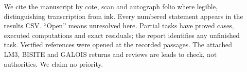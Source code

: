 We cite the manuscript \citep{D_Grothendieck1981} by cote, scan and autograph
folio where legible, distinguishing transcription from ink. Every numbered
statement appears in the results CSV. ``Open'' means unresolved here.
Partial tasks have proved cases, executed computations and exact residuals;
the report identifies any unfinished task. Verified references were opened
at the recorded passages. The attached LM3, BISITE and GALOIS returns and
reviews are leads to check, not authorities. We claim no priority.
